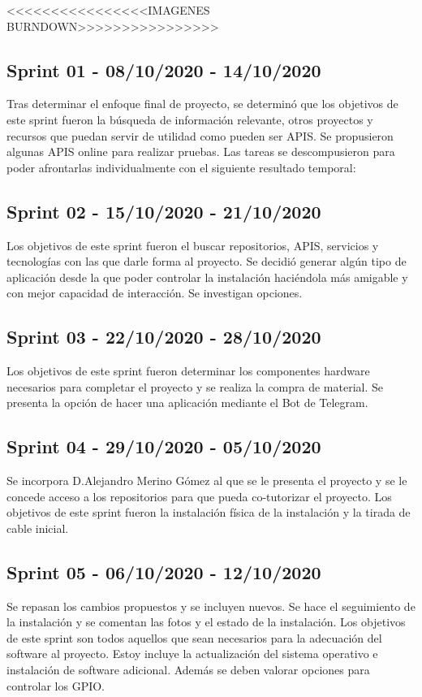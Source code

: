 <<<<<<<<<<<<<<<<IMAGENES BURNDOWN>>>>>>>>>>>>>>>>

\subsection{Sprint 01 - 08/10/2020 - 14/10/2020}
Tras determinar el enfoque final de proyecto, se determinó que los objetivos de este sprint fueron la búsqueda de información relevante, otros proyectos y recursos que puedan servir de utilidad como pueden ser APIS. Se propusieron algunas APIS online para realizar pruebas.
Las tareas se descompusieron para poder afrontarlas individualmente con el siguiente resultado temporal:

\subsection{Sprint 02 - 15/10/2020 - 21/10/2020}
Los objetivos de este sprint fueron el buscar repositorios, APIS, servicios y tecnologías con las que darle forma al proyecto. Se decidió generar algún tipo de aplicación desde la que poder controlar la instalación haciéndola más amigable y con mejor capacidad de interacción. Se investigan opciones.

\subsection{Sprint 03 - 22/10/2020 - 28/10/2020}
Los objetivos de este sprint fueron determinar los componentes hardware necesarios para completar el proyecto y se realiza la compra de material.
Se presenta la opción de hacer una aplicación mediante el Bot de Telegram.

\subsection{Sprint 04 - 29/10/2020 - 05/10/2020}
Se incorpora D.Alejandro Merino Gómez al que se le presenta el proyecto y se le concede acceso a los repositorios para que pueda co-tutorizar el proyecto.
Los objetivos de este sprint fueron la instalación física de la instalación y la tirada de cable inicial.

\subsection{Sprint 05 - 06/10/2020 - 12/10/2020}
Se repasan los cambios propuestos y se incluyen nuevos. Se hace el seguimiento de la instalación y se comentan las fotos y el estado de la instalación.
Los objetivos de este sprint son todos aquellos que sean necesarios para la adecuación del software al proyecto. Estoy incluye la actualización del sistema operativo e instalación de software adicional. Además se deben valorar opciones para controlar los GPIO.






